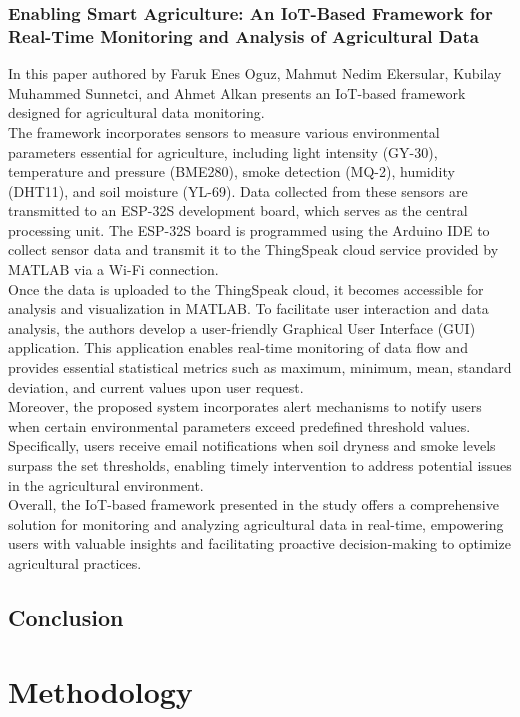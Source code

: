 \documentclass[12pt, a4paper]{article}
\begin{document}
\subsubsection{Enabling Smart Agriculture: An IoT-Based Framework for Real-Time Monitoring and Analysis of Agricultural Data}
In this paper authored by Faruk Enes Oguz, Mahmut Nedim Ekersular, Kubilay Muhammed Sunnetci, and Ahmet Alkan \cite{oguz2024enabling} presents an IoT-based framework designed for agricultural data monitoring.\\
The framework incorporates sensors to measure various environmental parameters essential for agriculture, including light intensity (GY-30), temperature and pressure (BME280), smoke detection (MQ-2), humidity (DHT11), and soil moisture (YL-69). Data collected from these sensors are transmitted to an ESP-32S development board, which serves as the central processing unit. The ESP-32S board is programmed using the Arduino IDE to collect sensor data and transmit it to the ThingSpeak cloud service provided by MATLAB via a Wi-Fi connection.\\
Once the data is uploaded to the ThingSpeak cloud, it becomes accessible for analysis and visualization in MATLAB. To facilitate user interaction and data analysis, the authors develop a user-friendly Graphical User Interface (GUI) application. This application enables real-time monitoring of data flow and provides essential statistical metrics such as maximum, minimum, mean, standard deviation, and current values upon user request.\\
Moreover, the proposed system incorporates alert mechanisms to notify users when certain environmental parameters exceed predefined threshold values. Specifically, users receive email notifications when soil dryness and smoke levels surpass the set thresholds, enabling timely intervention to address potential issues in the agricultural environment.\\
Overall, the IoT-based framework presented in the study offers a comprehensive solution for monitoring and analyzing agricultural data in real-time, empowering users with valuable insights and facilitating proactive decision-making to optimize agricultural practices.

\subsection{Conclusion}
\newpage

\section{Methodology}
\end{document}
